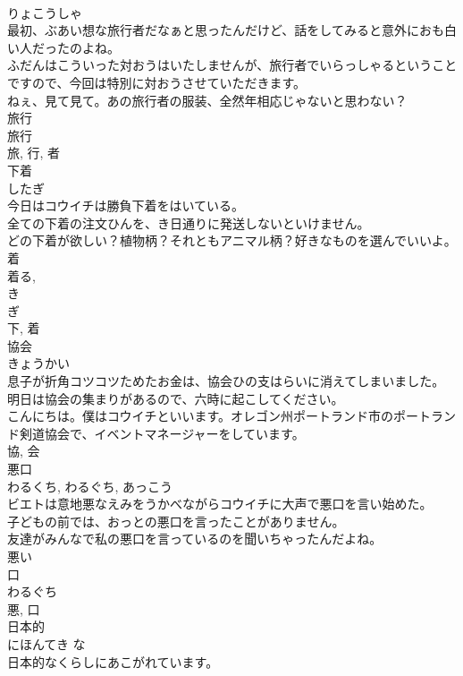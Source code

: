 \documentclass[8pt]{extreport}
\begin{document}
\begin{CJK}{UTF8}{min}
\\	りょこうしゃ	
\\	最初、ぶあい想な旅行者だなぁと思ったんだけど、話をしてみると意外におも白い人だったのよね。	
\\	ふだんはこういった対おうはいたしませんが、旅行者でいらっしゃるということですので、今回は特別に対おうさせていただきます。	
\\	ねぇ、見て見て。あの旅行者の服装、全然年相応じゃないと思わない？	
\\	旅行 
\\	旅行 
\\	旅, 行, 者	
\\	下着	
\\	したぎ	
\\	今日はコウイチは勝負下着をはいている。	
\\	全ての下着の注文ひんを、き日通りに発送しないといけません。	
\\	どの下着が欲しい？植物柄？それともアニマル柄？好きなものを選んでいいよ。	
\\	着 
\\	着る, 
\\	き 
\\	ぎ 
\\	下, 着	
\\	協会	
\\	きょうかい	
\\	息子が折角コツコツためたお金は、協会ひの支はらいに消えてしまいました。	
\\	明日は協会の集まりがあるので、六時に起こしてください。	
\\	こんにちは。僕はコウイチといいます。オレゴン州ポートランド市のポートランド剣道協会で、イベントマネージャーをしています。	
\\	協, 会	
\\	悪口	
\\	わるくち, わるぐち, あっこう	
\\	ビエトは意地悪なえみをうかべながらコウイチに大声で悪口を言い始めた。	
\\	子どもの前では、おっとの悪口を言ったことがありません。	
\\	友達がみんなで私の悪口を言っているのを聞いちゃったんだよね。	
\\	悪い 
\\	口 
\\	わるぐち 
\\	悪, 口	
\\	日本的	
\\	にほんてき	な 
\\	日本的なくらしにあこがれています。	

\end{CJK}
\end{document}
